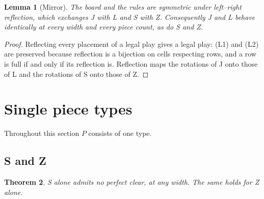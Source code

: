 \documentclass[11pt,a4paper]{article}
\theoremstyle{plain}
\newtheorem{theorem}{Theorem}
\newtheorem{lemma}[theorem]{Lemma}
\theoremstyle{definition}
\theoremstyle{remark}
\begin{document}
\begin{lemma}[Mirror]
\label{lem:mirror}
The board and the rules are symmetric under left--right reflection, which exchanges
J with L and S with Z. Consequently J and L behave identically at every width and
every piece count, as do S and Z.
\end{lemma}

\begin{proof}
Reflecting every placement of a legal play gives a legal play: (L1) and (L2) are
preserved because reflection is a bijection on cells respecting rows, and a row is
full if and only if its reflection is. Reflection maps the rotations of J onto those
of L and the rotations of S onto those of Z.
\end{proof}

\section{Single piece types}

Throughout this section $P$ consists of one type.

\subsection{S and Z}

\begin{theorem}
\label{thm:S}
S alone admits no perfect clear, at any width. The same holds for Z alone.
\end{theorem}
\end{document}
